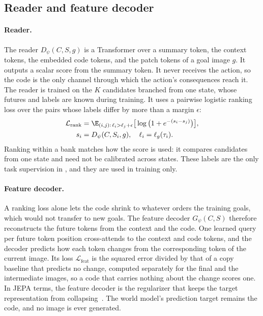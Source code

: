 \subsection{Reader and feature decoder}
\label{sec:reader}
\paragraph{Reader.}
The reader $D_\psi(C,S,g)$ is a Transformer over a summary token, the context tokens, the embedded code tokens, and the patch tokens of a goal image $g$.
It outputs a scalar score from the summary token.
It never receives the action, so the code is the only channel through which the action's consequences reach it.
The reader is trained on the $K$ candidates branched from one state, whose futures and labels are known during training.
It uses a pairwise logistic ranking loss over the pairs whose labels differ by more than a margin $\epsilon$:
\begin{equation}
\begin{aligned}
  \mathcal{L}_{\mathrm{rank}}&=\E_{(i,j):\,\ell_i>\ell_j+\epsilon}\big[\log\big(1+e^{-(s_i-s_j)}\big)\big],\\
  s_i&=D_\psi(C,S_i,g),\quad \ell_i=\ell_g(\tau_i).
\end{aligned}
\label{eq:rank}
\end{equation}
Ranking within a bank matches how the score is used: it compares candidates from one state and need not be calibrated across states.
These labels are the only task supervision in \method, and they are used in training only.

\paragraph{Feature decoder.}
A ranking loss alone lets the code shrink to whatever orders the training goals, which would not transfer to new goals.
The feature decoder $G_\psi(C,S)$ therefore reconstructs the future tokens from the context and the code.
One learned query per future token position cross-attends to the context and code tokens, and the decoder predicts how each token changes from the corresponding token of the current image.
Its loss $\mathcal{L}_{\mathrm{feat}}$ is the squared error divided by that of a copy baseline that predicts no change, computed separately for the final and the intermediate images, so a code that carries nothing about the change scores one.
In JEPA terms, the feature decoder is the regularizer that keeps the target representation from collapsing~\cite{lecun2022path}.
The world model's prediction target remains the code, and no image is ever generated.

